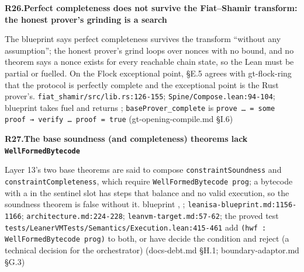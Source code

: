 \par\medskip\noindent\textbf{R26.}\enspace\textbf{Perfect completeness does not survive the Fiat–Shamir transform: the honest prover's grinding is a search}\par\nopagebreak
{} The blueprint says perfect completeness survives the transform ``without any assumption''; the honest prover's grind loops over nonces with no bound, and no theorem says a nonce exists for every reachable chain state, so the Lean  must be partial or fuelled. On the Flock exceptional point, §E.5 agrees with gt-flock-ring that the protocol is perfectly complete and the exceptional point is the Rust prover's.
 \texttt{fiat\_\allowbreak{}shamir/\allowbreak{}src/\allowbreak{}lib.\allowbreak{}rs:\allowbreak{}126-\allowbreak{}155}; \texttt{Spine/\allowbreak{}Compose.\allowbreak{}lean:\allowbreak{}94-\allowbreak{}104}; blueprint 
  takes fuel and returns ; \texttt{base\allowbreak{}Prover\_\allowbreak{}complete} is \texttt{prove … =\allowbreak{} some proof → verify … proof =\allowbreak{} true} (gt-opening-compile.md §I.6)

\par\medskip\noindent\textbf{R27.}\enspace\textbf{The base soundness (and completeness) theorems lack \texttt{Well\allowbreak{}Formed\allowbreak{}Bytecode}}\par\nopagebreak
{} Layer 13's two base theorems are said to compose \texttt{constraint\allowbreak{}Soundness} and \texttt{constraint\allowbreak{}Completeness}, which require \texttt{Well\allowbreak{}Formed\allowbreak{}Bytecode prog}; a bytecode with a  in the sentinel slot has steps that balance and no valid execution, so the soundness theorem is false without it.
 blueprint , ; \texttt{leanisa-\allowbreak{}blueprint.\allowbreak{}md:\allowbreak{}1156-\allowbreak{}1166}; \texttt{architecture.\allowbreak{}md:\allowbreak{}224-\allowbreak{}228}; \texttt{leanvm-\allowbreak{}target.\allowbreak{}md:\allowbreak{}57-\allowbreak{}62}; the proved test \texttt{tests/\allowbreak{}Leaner\allowbreak{}VMTests/\allowbreak{}Semantics/\allowbreak{}Execution.\allowbreak{}lean:\allowbreak{}415-\allowbreak{}461}
 add \texttt{(\allowbreak{}hwf :\allowbreak{} Well\allowbreak{}Formed\allowbreak{}Bytecode prog)} to both, or have  decide the condition and reject (a technical decision for the orchestrator) (docs-debt.md §H.1; boundary-adaptor.md §G.3)

